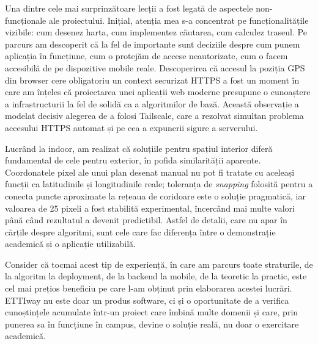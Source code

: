 Una dintre cele mai surprinzătoare lecții a fost legată de aspectele
non-funcționale ale proiectului. Inițial, atenția mea s-a concentrat pe
funcționalitățile vizibile: cum desenez harta, cum implementez căutarea, cum
calculez traseul. Pe parcurs am descoperit că la fel de importante sunt
deciziile despre cum punem aplicația în funcțiune, cum o protejăm de accese
neautorizate, cum o facem accesibilă de pe dispozitive mobile reale.
Descoperirea că accesul la poziția GPS din browser cere obligatoriu un context
securizat HTTPS a fost un moment în care am înțeles că proiectarea unei
aplicații web moderne presupune o cunoaștere a infrastructurii la fel de
solidă ca a algoritmilor de bază. Această observație a modelat decisiv
alegerea de a folosi Tailscale, care a rezolvat simultan problema accesului
HTTPS automat și pe cea a expunerii sigure a serverului.
 
Lucrând la indoor, am realizat că soluțiile pentru spațiul interior diferă
fundamental de cele pentru exterior, în pofida similarității aparente.
Coordonatele pixel ale unui plan desenat manual nu pot fi tratate cu aceleași
funcții ca latitudinile și longitudinile reale; toleranța de \textit{snapping}
folosită pentru a conecta puncte aproximate la rețeaua de coridoare este o
soluție pragmatică, iar valoarea de 25 pixeli a fost stabilită experimental,
încercând mai multe valori până când rezultatul a devenit predictibil. Astfel
de detalii, care nu apar în cărțile despre algoritmi, sunt cele care fac
diferența între o demonstrație academică și o aplicație utilizabilă.
 
Consider că tocmai acest tip de experiență, în care am parcurs
toate straturile, de la algoritm la deployment, de la backend la mobile, de
la teoretic la practic, este cel mai prețios beneficiu pe care l-am obținut
prin elaborarea acestei lucrări. ETTIway nu este doar un produs software, ci
și o oportunitate de a verifica cunoștințele acumulate într-un proiect care
îmbină multe domenii și care, prin punerea sa în funcțiune în campus, devine
o soluție reală, nu doar o exercitare academică.
 